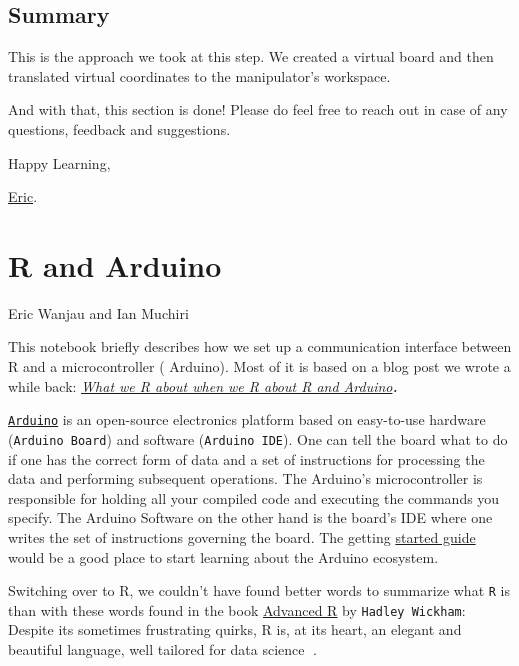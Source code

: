 \documentclass[
  letterpaper,
  DIV=11,
  numbers=noendperiod]{scrreprt}
\begin{document}
\hypertarget{summary-1}{%
\section{Summary}\label{summary-1}}

This is the approach we took at this step. We created a virtual board
and then translated virtual coordinates to the manipulator's workspace.

And with that, this section is done! Please do feel free to reach out in
case of any questions, feedback and suggestions.

Happy Learning,

\href{https://twitter.com/ericntay}{Eric}.


\hypertarget{r-and-arduino}{%
\chapter{R and Arduino}\label{r-and-arduino}}

Eric Wanjau and Ian Muchiri

\hfill\break

This notebook briefly describes how we set up a communication interface
between R and a microcontroller ( Arduino). Most of it is based on a
blog post we wrote a while back:
\href{https://rpubs.com/eR_ic/rduino}{\emph{What we R about when we R
about R and Arduino}}\textbf{\emph{.}}

\href{https://www.arduino.cc/en/Guide/Introduction}{\texttt{Arduino}} is
an open-source electronics platform based on easy-to-use hardware
(\texttt{Arduino\ Board}) and software (\texttt{Arduino\ IDE}). One can
tell the board what to do if one has the correct form of data and a set
of instructions for processing the data and performing subsequent
operations. The Arduino's microcontroller is responsible for holding all
your compiled code and executing the commands you specify. The Arduino
Software on the other hand is the board's IDE where one writes the set
of instructions governing the board. The getting
\href{https://www.arduino.cc/en/Guide}{started guide} would be a good
place to start learning about the Arduino ecosystem.

Switching over to R, we couldn't have found better words to summarize
what \texttt{R} is than with these words found in the book
\href{https://adv-r.hadley.nz/introduction.html}{Advanced R} by
\texttt{Hadley\ Wickham}: Despite its sometimes frustrating quirks, R
is, at its heart, an elegant and beautiful language, well tailored for
data science 🤗.
\end{document}
